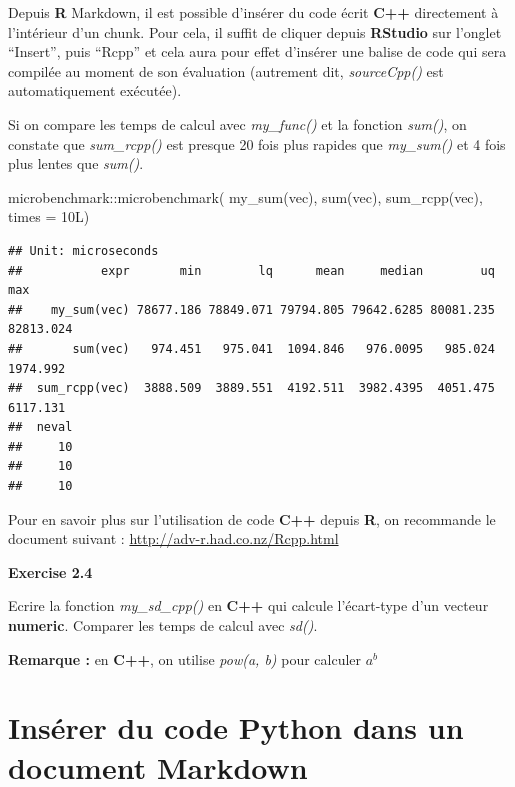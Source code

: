 \documentclass[
]{book}
\newenvironment{Shaded}{\begin{snugshade}}{\end{snugshade}}
\newcommand{\AttributeTok}[1]{\textcolor[rgb]{0.77,0.63,0.00}{#1}}
\newcommand{\FunctionTok}[1]{\textcolor[rgb]{0.00,0.00,0.00}{#1}}
\newcommand{\NormalTok}[1]{#1}
\newcommand{\SpecialCharTok}[1]{\textcolor[rgb]{0.00,0.00,0.00}{#1}}
\theoremstyle{definition}
\theoremstyle{definition}
\theoremstyle{definition}
\theoremstyle{definition}
\theoremstyle{remark}
\begin{document}
Depuis \textbf{R} Markdown, il est possible d'insérer du code écrit \textbf{C++} directement à l'intérieur d'un chunk. Pour cela, il suffit de cliquer depuis \textbf{RStudio} sur l'onglet ``Insert'', puis ``Rcpp'' et cela aura pour effet d'insérer une balise de code qui sera compilée au moment de son évaluation (autrement dit, \emph{sourceCpp()} est automatiquement exécutée).

Si on compare les temps de calcul avec \emph{my\_func()} et la fonction \emph{sum()}, on constate que \emph{sum\_rcpp()} est presque 20 fois plus rapides que \emph{my\_sum()} et 4 fois plus lentes que \emph{sum()}.

\begin{Shaded}
\begin{Highlighting}[]
\NormalTok{ microbenchmark}\SpecialCharTok{::}\FunctionTok{microbenchmark}\NormalTok{(}
   \FunctionTok{my\_sum}\NormalTok{(vec),}
   \FunctionTok{sum}\NormalTok{(vec), }
   \FunctionTok{sum\_rcpp}\NormalTok{(vec),}
   \AttributeTok{times =}\NormalTok{ 10L)}
\end{Highlighting}
\end{Shaded}

\begin{verbatim}
## Unit: microseconds
##           expr       min        lq      mean     median        uq       max
##    my_sum(vec) 78677.186 78849.071 79794.805 79642.6285 80081.235 82813.024
##       sum(vec)   974.451   975.041  1094.846   976.0095   985.024  1974.992
##  sum_rcpp(vec)  3888.509  3889.551  4192.511  3982.4395  4051.475  6117.131
##  neval
##     10
##     10
##     10
\end{verbatim}

Pour en savoir plus sur l'utilisation de code \textbf{C++} depuis \textbf{R}, on recommande le document suivant : \url{http://adv-r.had.co.nz/Rcpp.html}

\textbf{Exercise 2.4}

Ecrire la fonction \emph{my\_sd\_cpp()} en \textbf{C++} qui calcule l'écart-type d'un vecteur \textbf{numeric}. Comparer les temps de calcul avec \emph{sd()}.

\textbf{Remarque :} en \textbf{C++}, on utilise \emph{pow(a, b)} pour calculer \(a^b\)

\hypertarget{insuxe9rer-du-code-python-dans-un-document-markdown}{%
\section{Insérer du code Python dans un document Markdown}\label{insuxe9rer-du-code-python-dans-un-document-markdown}}
\end{document}
